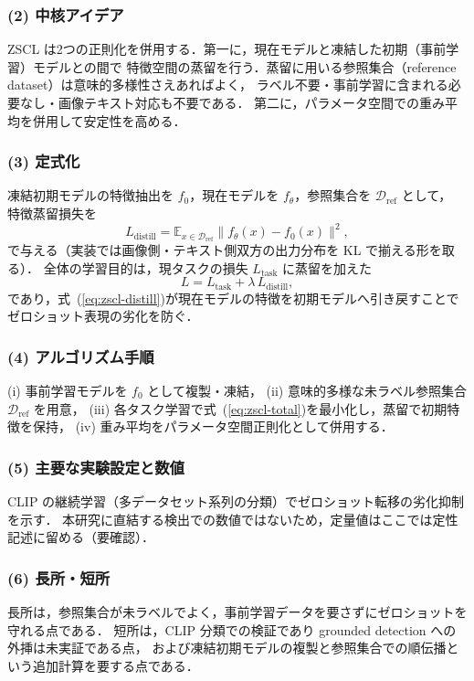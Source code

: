\subsubsection*{(2) 中核アイデア}
ZSCL は2つの正則化を併用する．第一に，現在モデルと凍結した初期（事前学習）モデルとの間で
特徴空間の蒸留を行う．蒸留に用いる参照集合（reference dataset）は意味的多様性さえあればよく，
ラベル不要・事前学習に含まれる必要なし・画像テキスト対応も不要である．
第二に，パラメータ空間での重み平均を併用して安定性を高める．

\subsubsection*{(3) 定式化}
凍結初期モデルの特徴抽出を $f_{0}$，現在モデルを $f_{\theta}$，参照集合を $\mathcal{D}_{\mathrm{ref}}$ として，
特徴蒸留損失を
\begin{equation}
L_{\mathrm{distill}} = \mathbb{E}_{x \in \mathcal{D}_{\mathrm{ref}}}
  \bigl\| f_{\theta}(x) - f_{0}(x) \bigr\|^{2},
\label{eq:zscl-distill}
\end{equation}
で与える（実装では画像側・テキスト側双方の出力分布を KL で揃える形を取る）．
全体の学習目的は，現タスクの損失 $L_{\mathrm{task}}$ に蒸留を加えた
\begin{equation}
L = L_{\mathrm{task}} + \lambda\,L_{\mathrm{distill}},
\label{eq:zscl-total}
\end{equation}
であり，式~(\ref{eq:zscl-distill})が現在モデルの特徴を初期モデルへ引き戻すことで
ゼロショット表現の劣化を防ぐ．

\subsubsection*{(4) アルゴリズム手順}
(i) 事前学習モデルを $f_0$ として複製・凍結，
(ii) 意味的多様な未ラベル参照集合 $\mathcal{D}_{\mathrm{ref}}$ を用意，
(iii) 各タスク学習で式~(\ref{eq:zscl-total})を最小化し，蒸留で初期特徴を保持，
(iv) 重み平均をパラメータ空間正則化として併用する．

\subsubsection*{(5) 主要な実験設定と数値}
CLIP の継続学習（多データセット系列の分類）でゼロショット転移の劣化抑制を示す．
本研究に直結する検出での数値ではないため，定量値はここでは定性記述に留める（要確認）．

\subsubsection*{(6) 長所・短所}
長所は，参照集合が未ラベルでよく，事前学習データを要さずにゼロショットを守れる点である．
短所は，CLIP 分類での検証であり grounded detection への外挿は未実証である点，
および凍結初期モデルの複製と参照集合での順伝播という追加計算を要する点である．

